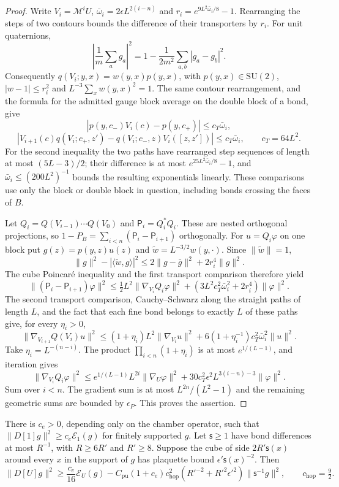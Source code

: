 \documentclass[11pt,letterpaper,reqno]{amsart}
\makeatletter
\theoremstyle{definition}
\newcommand{\ms@minorstart}{%
  \pushQED{\qed}\renewcommand{\qedsymbol}{$\blacksquare$}}
\newenvironment{lemma}[1][]{\ms@minorstart\ms@lemma[#1]}
  {\popQED\endms@lemma}
\theoremstyle{remark}
\makeatother
\begin{document}
\begin{proof}
Write $V_i=\mathcal M^iU$,
$\bar\omega_i=2\epsilon L^{2(i-n)}$ and
$r_i=e^{9L^2\bar\omega_i/8}-1$.
Rearranging the steps of two contours bounds the difference of their
transporters by $r_i$.  For unit quaternions,
\[
 \left|\frac1m\sum_ag_a\right|^2
 =1-\frac1{2m^2}\sum_{a,b}|g_a-g_b|^2.
\]
Consequently $q(V_i;y,x)=w(y,x)p(y,x)$, with
$p(y,x)\in\mathrm{SU}(2)$, $|w-1|\le r_i^2$ and
$L^{-3}\sum_xw(y,x)^2=1$.
The same contour rearrangement, and the formula for the admitted
gauge block average on the double block of a bond, give
\[
 |p(y,c_-)V_i(c)-p(y,c_+)|\le c_T\bar\omega_i,
\]
\[
 |V_{i+1}(c)q(V_i;c_+,z')-
                 q(V_i;c_-,z)V_i([z,z'])|\le c_T\bar\omega_i,
 \qquad c_T=64L^2.
\]
For the second inequality the two paths have rearranged step
sequences of length at most $(5L-3)/2$; their difference is at most
$e^{25L^2\bar\omega_i/8}-1$, and
$\bar\omega_i\le(200L^2)^{-1}$ bounds the resulting exponentials
linearly.  These comparisons use only the block or double block in
question, including bonds crossing the faces of $B$.

Let $Q_i=Q(V_{i-1})\cdots Q(V_0)$ and
$\mathsf P_i=Q_i^*Q_i$.  These are nested orthogonal projections,
so $1-P_B=\sum_{i<n}(\mathsf P_i-\mathsf P_{i+1})$ orthogonally.
For $u=Q_i\varphi$ on one block put $g(z)=p(y,z)u(z)$ and
$\tilde w=L^{-3/2}w(y,\cdot)$.
Since $\|\tilde w\|=1$,
\[
 \|g\|^2-|\langle\tilde w,g\rangle|^2
 \le2\|g-\bar g\|^2+2r_i^4\|g\|^2.
\]
The cube Poincar\'e inequality and the first transport comparison
therefore yield
\[
 \|(\mathsf P_i-\mathsf P_{i+1})\varphi\|^2
 \le\tfrac12L^2\|\nabla_{V_i}Q_i\varphi\|^2+
        (3L^2c_T^2\bar\omega_i^2+2r_i^4)\|\varphi\|^2.
\]
The second transport comparison, Cauchy--Schwarz along the straight
paths of length $L$, and the fact that each fine bond belongs to
exactly $L$ of these paths give, for every $\eta_i>0$,
\[
 \|\nabla_{V_{i+1}}Q(V_i)u\|^2
 \le(1+\eta_i)L^2\|\nabla_{V_i}u\|^2+
          6(1+\eta_i^{-1})c_T^2\bar\omega_i^2\|u\|^2.
\]
Take $\eta_i=L^{-(n-i)}$. The product $\prod_{i<n}(1+\eta_i)$ is at most
$e^{1/(L-1)}$, and iteration gives
\[
 \|\nabla_{V_i}Q_i\varphi\|^2
 \le e^{1/(L-1)}L^{2i}\|\nabla_U\varphi\|^2+
       30c_T^2\epsilon^2L^{3(i-n)-3}\|\varphi\|^2.
\]
Sum over $i<n$.  The gradient sum is at most
$L^{2n}/(L^2-1)$ and the remaining geometric sums are bounded by
$\epsilon_P$.  This proves the assertion.
\end{proof}

\begin{lemma}[Localized ellipticity]\label{C-397-26}
There is $c_e>0$, depending only on the chamber operator, such that
$\|D[1]g\|^2\ge c_e\mathcal E_1(g)$ for finitely supported $g$.
Let $\mathsf s\ge1$ have bond differences at most $R^{-1}$, with
$R\ge6R'$ and $R'\ge8$.  Suppose the cube of side
$2R'\mathsf s(x)$ around every $x$ in the support of $g$ has
plaquette bound $\epsilon'\mathsf s(x)^{-2}$.  Then
\[
 \|D[U]g\|^2\ge\frac{c_e}{16}\mathcal E_U(g)
 -C_{\mathrm{pu}}(1+c_e)c_{\mathrm{hop}}^2
       (R'^{-2}+R'^2\epsilon'^2)\|\mathsf s^{-1}g\|^2,
 \qquad c_{\mathrm{hop}}=\tfrac92.
\]
\end{lemma}
\end{document}
